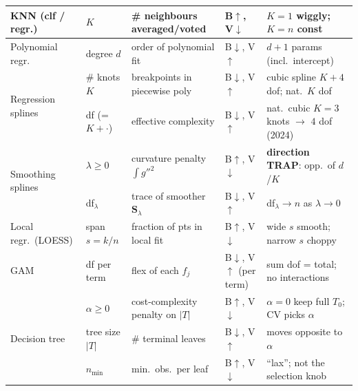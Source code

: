 {\begin{center}
\begin{tabular*}{\textwidth}{@{\extracolsep{\fill}} l l l l l @{}}
KNN (clf / regr.)  & $K$                 & \# neighbours averaged/voted & B$\uparrow$, V$\downarrow$           & $K{=}1$ wiggly; $K{=}n$ const \\
\midrule

Polynomial regr.   & degree $d$          & order of polynomial fit      & B$\downarrow$, V$\uparrow$           & $d{+}1$ params (incl.\ intercept) \\
\midrule

\multirow{2}{*}{Regression splines}
                   & \# knots $K$        & breakpoints in piecewise poly & B$\downarrow$, V$\uparrow$          & cubic spline $K{+}4$ dof; nat.\ $K$ dof \\
                   & df (= $K{+}{\cdot}$)& effective complexity         & B$\downarrow$, V$\uparrow$           & nat.\ cubic $K{=}3$ knots $\to$ $4$ dof (2024) \\
\midrule

\multirow{2}{*}{Smoothing splines}
                   & $\lambda \geq 0$    & curvature penalty $\int g''^2$ & B$\uparrow$, V$\downarrow$         & \textbf{direction TRAP}: opp.\ of $d$/$K$ \\
                   & df$_\lambda$        & trace of smoother $\mathbf S_\lambda$ & B$\downarrow$, V$\uparrow$    & df$_\lambda \to n$ as $\lambda{\to}0$ \\
\midrule

Local regr.\ (LOESS) & span $s = k/n$    & fraction of pts in local fit & B$\uparrow$, V$\downarrow$           & wide $s$ smooth; narrow $s$ choppy \\
\midrule

GAM                & df per term         & flex of each $f_j$           & B$\downarrow$, V$\uparrow$ (per term) & sum dof = total; no interactions \\
\midrule

\multirow{3}{*}{Decision tree}
                   & $\alpha \geq 0$     & cost-complexity penalty on $|T|$ & B$\uparrow$, V$\downarrow$       & $\alpha{=}0$ keep full $T_0$; CV picks $\alpha$ \\
                   & tree size $|T|$     & \# terminal leaves           & B$\downarrow$, V$\uparrow$           & moves opposite to $\alpha$ \\
                   & $n_{\min}$          & min.\ obs.\ per leaf         & B$\uparrow$, V$\downarrow$           & ``lax''; not the selection knob \\
\midrule


\end{tabular*}
\end{center}}
